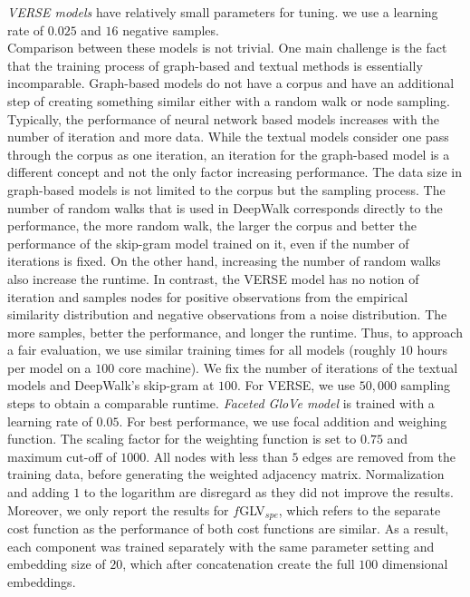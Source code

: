\noindent
\emph{VERSE models} have relatively small parameters for tuning. we use a learning rate of $0.025$ and $16$ negative samples.\\

\noindent
Comparison between these models is not trivial. One main challenge is the fact that the training process of graph-based and textual methods is essentially incomparable. Graph-based models do not have a corpus and have an additional step of creating something similar either with a random walk or node sampling. Typically, the performance of neural network based models increases with the number of iteration and more data. While the textual models consider one pass through the corpus as one iteration, an iteration for the graph-based model is a different concept and not the only factor increasing performance. The data size in graph-based models is not limited to the corpus but the sampling process. The number of random walks that is used in DeepWalk corresponds directly to the performance, the more random walk, the larger the corpus and better the performance of the skip-gram model trained on it, even if the number of iterations is fixed. On the other hand, increasing the number of random walks also increase the runtime. In contrast, the VERSE model has no notion of iteration and samples nodes for positive observations from the empirical similarity distribution and negative observations from a  noise distribution. The more samples, better the performance, and longer the runtime. Thus, to approach a fair evaluation, we use similar training times for all models (roughly $10$ hours per model on a $100$ core machine). We fix the number of iterations of the textual models and DeepWalk's skip-gram at $100$. For VERSE, we use $50,000$ sampling steps to obtain a comparable runtime.
\emph{Faceted GloVe model} is trained with a learning rate of $0.05$. For best performance, we use focal addition and weighing function. The scaling factor for the weighting function is set to $0.75$ and maximum cut-off of $1000$. All nodes with less than $5$ edges are removed from the training data, before generating the weighted adjacency matrix. Normalization and adding $1$ to the logarithm are disregard as they did not improve the results. Moreover, we only report the results for $f$GLV$_{spe}$, which refers to the separate cost function as the performance of both cost functions are similar. As a result, each component was trained separately with the same parameter setting and embedding size of $20$, which after concatenation create the full $100$ dimensional embeddings. \\

